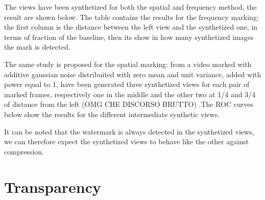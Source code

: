 The views have been synthetized for both the spatial and frequency method, the result are shown below.\newline
The table contains the results for the frequency marking: the first column is the distance between the left view and the synthetized one, in terms of fraction of the baseline, then its show in how many synthetized images the mark is detected.

\begin{table}[htbp]
 \label{Tab:syntDFT}
 \begin{center}
 \caption{}
 \end{center}
 \end{table}
 
  
The same study is proposed for the spatial marking: from a video marked with additive gaussian noise distribuited with zero mean and unit variance, added with power equal to 1, have been generated three synthetized views for each pair of marked frames, respectively one in the middle and the other two at 1/4 and 3/4 of distance from the left (OMG CHE DISCORSO BRUTTO) .\newline The ROC curves below show the results for the different intermediate synthetic views.\newline
 

It can be noted that the watermark is always detected in the synthetized views, we can therefore expect the synthetized views to behave like the other against compression.
 
\section{Transparency}